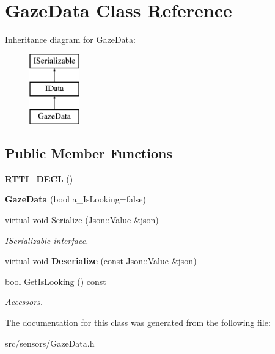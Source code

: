 \hypertarget{class_gaze_data}{}\section{Gaze\+Data Class Reference}
\label{class_gaze_data}
Inheritance diagram for Gaze\+Data\+:\begin{figure}[H]
\begin{center}
\leavevmode
\includegraphics[height=3.000000cm]{class_gaze_data}
\end{center}
\end{figure}
\subsection*{Public Member Functions}
\begin{DoxyCompactItemize}
\item 
\mbox{\label{class_gaze_data_ad3928e7241a0d1a5e4503a80a61b9d5c}} 
{\bfseries R\+T\+T\+I\+\_\+\+D\+E\+CL} ()
\item 
\mbox{\label{class_gaze_data_a4cc80b561b9ff9639c6b64dbf90a761b}} 
{\bfseries Gaze\+Data} (bool a\+\_\+\+Is\+Looking=false)
\item 
\mbox{\label{class_gaze_data_afb48496a87cd44edc2d0f89a08a1ee8d}} 
virtual void \hyperlink{class_gaze_data_afb48496a87cd44edc2d0f89a08a1ee8d}{Serialize} (Json\+::\+Value \&json)
\begin{DoxyCompactList}\small\item\em I\+Serializable interface. \end{DoxyCompactList}\item 
\mbox{\label{class_gaze_data_ab266c4beee8f2df252deb90fc8d737bd}} 
virtual void {\bfseries Deserialize} (const Json\+::\+Value \&json)
\item 
\mbox{\label{class_gaze_data_a97f27e2d25014fd9f6ac694602a60628}} 
bool \hyperlink{class_gaze_data_a97f27e2d25014fd9f6ac694602a60628}{Get\+Is\+Looking} () const
\begin{DoxyCompactList}\small\item\em Accessors. \end{DoxyCompactList}\end{DoxyCompactItemize}


The documentation for this class was generated from the following file\+:\begin{DoxyCompactItemize}
\item 
src/sensors/Gaze\+Data.\+h\end{DoxyCompactItemize}
